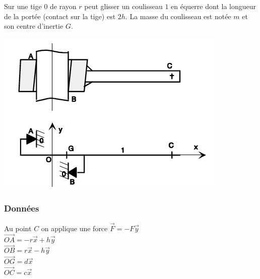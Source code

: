 
Sur une tige $0$ de rayon $r$ peut glisser un coulisseau $1$ en équerre dont la longueur de la portée (contact sur la tige) est $2h$. La masse du coulisseau est notée $m$ et son centre d'inertie $G$.

\begin{center}
\includegraphics[scale=0.5]{png/arcbout.png}
\end{center}

\subsubsection{Données}
Au point $C$ on applique une force $\overrightarrow{F}=-F\overrightarrow{y}$\\
$\overrightarrow{OA}=-r\overrightarrow{x}+h\overrightarrow{y}$\\
$\overrightarrow{OB}=r\overrightarrow{x}-h\overrightarrow{y}$\\
$\overrightarrow{OG}=d\overrightarrow{x}$\\
$\overrightarrow{OC}=c\overrightarrow{x}$

